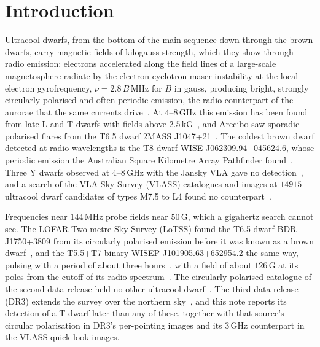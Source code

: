 \documentclass[3p,11pt]{elsarticle}
\begin{document}
\section{Introduction}\label{sec:intro}

Ultracool dwarfs, from the bottom of the main sequence down through the brown dwarfs,
carry magnetic fields of kilogauss strength, which they show through radio emission:
electrons accelerated along
the field lines of a large-scale magnetosphere radiate by the electron-cyclotron maser
instability at the local electron gyrofrequency, $\nu=2.8\,B$\,MHz for $B$ in gauss,
producing bright, strongly circularly polarised and often periodic emission, the radio
counterpart of the aurorae that the same currents drive~\cite{Treumann2006,Hallinan2015}.
At $4$--$8$\,GHz this emission has been found from late L and T dwarfs with fields above
$2.5$\,kG~\cite{Kao2016}, and Arecibo saw sporadic polarised flares from the T6.5 dwarf
2MASS J1047+21~\cite{RouteWolszczan2012}. The coldest brown dwarf detected at radio
wavelengths is the T8 dwarf WISE J062309.94$-$045624.6, whose periodic emission the
Australian Square Kilometre Array Pathfinder found~\cite{Rose2023}. Three Y dwarfs
observed at $4$--$8$\,GHz with the Jansky VLA gave no detection~\cite{Kao2019}, and a
search of the VLA Sky Survey (VLASS) catalogues and images at $14915$ ultracool dwarf
candidates of types M7.5 to L4 found no counterpart~\cite{Perger2025}.

Frequencies near $144$\,MHz probe fields near $50$\,G, which a gigahertz search cannot
see. The LOFAR Two-metre Sky Survey (LoTSS) found the T6.5 dwarf BDR J1750+3809 from its
circularly polarised emission before it was known as a brown dwarf~\cite{Vedantham2020},
and the T5.5+T7 binary WISEP J101905.63+652954.2 the same way, pulsing with a period of
about three hours~\cite{Vedantham2023}, with a field of about $126$\,G at its poles from the cutoff of
its radio spectrum~\cite{Yiu2026}. The circularly polarised catalogue of the second data
release held no other ultracool dwarf~\cite{Callingham2023}. The third data release
(DR3) extends the survey over the northern sky~\cite{Shimwell2026}, and this note reports
its detection of a T dwarf later than any of these, together with that source's circular
polarisation in DR3's per-pointing images and its $3$\,GHz counterpart in the VLASS
quick-look images.
\end{document}
